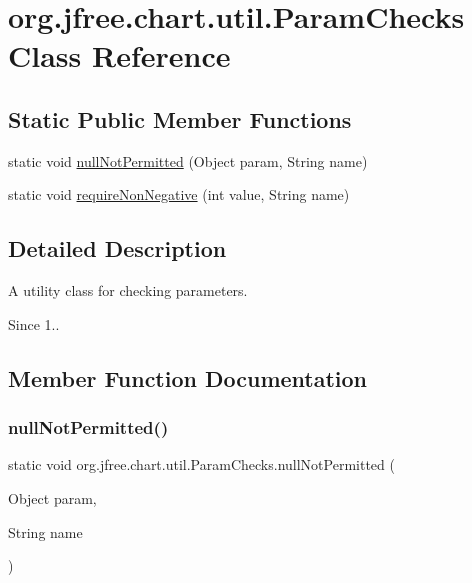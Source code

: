 \hypertarget{classorg_1_1jfree_1_1chart_1_1util_1_1_param_checks}{}\section{org.\+jfree.\+chart.\+util.\+Param\+Checks Class Reference}
\label{classorg_1_1jfree_1_1chart_1_1util_1_1_param_checks}
\subsection*{Static Public Member Functions}
\begin{DoxyCompactItemize}
\item 
static void \mbox{\hyperlink{classorg_1_1jfree_1_1chart_1_1util_1_1_param_checks_aea7fd14edd941748b0e52eae33999cf4}{null\+Not\+Permitted}} (Object param, String name)
\item 
static void \mbox{\hyperlink{classorg_1_1jfree_1_1chart_1_1util_1_1_param_checks_aea5edb687db604a63251d08dc4c04570}{require\+Non\+Negative}} (int value, String name)
\end{DoxyCompactItemize}


\subsection{Detailed Description}
A utility class for checking parameters.

\begin{DoxySince}{Since}
1.. 
\end{DoxySince}


\subsection{Member Function Documentation}
\mbox{\label{classorg_1_1jfree_1_1chart_1_1util_1_1_param_checks_aea7fd14edd941748b0e52eae33999cf4}} 
\subsubsection{\texorpdfstring{null\+Not\+Permitted()}{nullNotPermitted()}}
{\footnotesize\ttfamily static void org.\+jfree.\+chart.\+util.\+Param\+Checks.\+null\+Not\+Permitted (\begin{DoxyParamCaption}\item[{Object}]{param,  }\item[{String}]{name }\end{DoxyParamCaption})\hspace{0.3cm}{\ttfamily [static]}}

